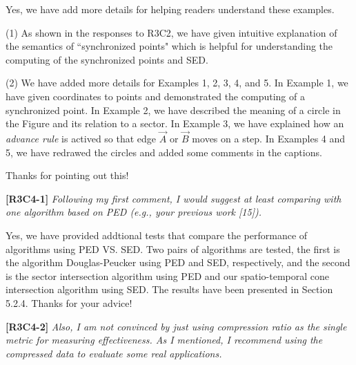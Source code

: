\documentclass{letter}
\begin{document}
Yes, we have add more details for helping readers understand these examples.

(1) As shown in the responses to R3C2, we have given intuitive explanation of the semantics of ``synchronized points" which is helpful for understanding the computing of the synchronized points and SED.

(2) We have added more details for Examples 1, 2, 3, 4, and 5. In Example 1, we have given coordinates to points and demonstrated the computing of a synchronized point. In Example 2, we have described the meaning of a circle in the Figure and its relation to a sector. In Example 3, we have explained how an \emph{advance rule} is actived so that edge $\overrightarrow{A}$ or $\overrightarrow{B}$ moves on a step. In Examples 4 and 5, we have redrawed the circles and added some comments in the captions.

Thanks for pointing out this!

\textbf{[R3C4-1]} \emph{Following my first comment, I would suggest at least comparing with one algorithm based on PED (e.g., your previous work [15]). }

Yes, we have provided addtional tests that compare the performance of algorithms using PED VS. SED. Two pairs of algorithms are tested, the first is the algorithm Douglas-Peucker using PED and SED, respectively, and the second is the sector intersection algorithm using PED and our spatio-temporal cone intersection algorithm using SED. %
The results have been presented in Section 5.2.4. Thanks for your advice!


\textbf{[R3C4-2]} \emph{Also, I am not convinced by just using compression ratio as the single metric for measuring effectiveness. As I mentioned, I recommend using the compressed data to evaluate some real applications.}
\end{document}
